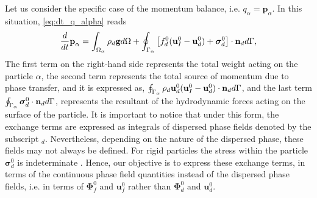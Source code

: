 Let us consider the specific case of the momentum balance, i.e. $q_\alpha = \textbf{p}_\alpha$.
In this situation, \ref{eq:dt_q_alpha} reads
\begin{equation}
    \ddt  \textbf{p}_\alpha
    = \intO{ \rho_d\textbf{g} }
    + \intS{ 
        \left[
        f_d^0 (\textbf{u}_I^0-\textbf{u}_d^0)
         + \bm{\sigma}_d^0%
        \right] 
        \cdot \textbf{n}_d },
\end{equation}
The first term on the right-hand side represents the total weight acting on the particle $\alpha$, 
the second term represents the total source of momentum due to phase transfer, and it is expressed as, $\oint_{\Gamma_\alpha}  \rho_d \textbf{u}_d^0 (\textbf{u}_I^0-\textbf{u}_d^0)\cdot\textbf{n}_d  d\Gamma$,
and the last term $\oint_{\Gamma_\alpha}  \bm{\sigma}_d^0\cdot\textbf{n}_d  d\Gamma$, represents the resultant of the hydrodynamic forces acting on the surface of the particle.
It is important to notice that under this form, the exchange terms are expressed as integrals of dispersed phase fields denoted by the subscript $_d$.
Nevertheless, depending on the nature of the dispersed phase, these fields may not always be defined.
For rigid particles the stress within the particle $\bm{\sigma}_d^0$ is indeterminate \citep{guazzelli2011}.  
Hence, our objective is to express these exchange terms, in terms of the continuous phase field quantities instead of the dispersed phase fields, i.e. in terms of $\mathbf{\Phi}_f^0$ and $\textbf{u}_f^0$ rather than $\mathbf{\Phi}_d^0$ and $\textbf{u}_d^0$. 

